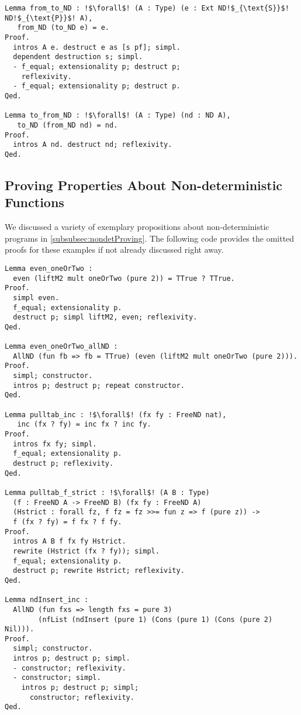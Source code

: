 \begin{verbatim}
Lemma from_to_ND : !$\forall$! (A : Type) (e : Ext ND!$_{\text{S}}$! ND!$_{\text{P}}$! A),
   from_ND (to_ND e) = e.
Proof.
  intros A e. destruct e as [s pf]; simpl.
  dependent destruction s; simpl.
  - f_equal; extensionality p; destruct p;
    reflexivity.
  - f_equal; extensionality p; destruct p.
Qed.

Lemma to_from_ND : !$\forall$! (A : Type) (nd : ND A),
   to_ND (from_ND nd) = nd.
Proof.
  intros A nd. destruct nd; reflexivity.
Qed.
\end{verbatim}

\subsection*{Proving Properties About Non\--deterministic Functions}
\label{subsec:appendix:proving}

We discussed a variety of exemplary propositions about non\--deterministic programs in \autoref{subsubsec:nondetProving}.
The following code provides the omitted proofs for these examples if not already discussed right away.

\begin{verbatim}
Lemma even_oneOrTwo :
  even (liftM2 mult oneOrTwo (pure 2)) = TTrue ? TTrue.
Proof.
  simpl even.
  f_equal; extensionality p.
  destruct p; simpl liftM2, even; reflexivity.
Qed.

Lemma even_oneOrTwo_allND :
  AllND (fun fb => fb = TTrue) (even (liftM2 mult oneOrTwo (pure 2))).
Proof.
  simpl; constructor.
  intros p; destruct p; repeat constructor.
Qed.

Lemma pulltab_inc : !$\forall$! (fx fy : FreeND nat),
   inc (fx ? fy) = inc fx ? inc fy.
Proof.
  intros fx fy; simpl.
  f_equal; extensionality p.
  destruct p; reflexivity.
Qed.
 
Lemma pulltab_f_strict : !$\forall$! (A B : Type)
  (f : FreeND A -> FreeND B) (fx fy : FreeND A)
  (Hstrict : forall fz, f fz = fz >>= fun z => f (pure z)) ->
  f (fx ? fy) = f fx ? f fy.
Proof.
  intros A B f fx fy Hstrict.
  rewrite (Hstrict (fx ? fy)); simpl.
  f_equal; extensionality p.
  destruct p; rewrite Hstrict; reflexivity.
Qed.

Lemma ndInsert_inc :
  AllND (fun fxs => length fxs = pure 3)
        (nfList (ndInsert (pure 1) (Cons (pure 1) (Cons (pure 2) Nil))).
Proof.
  simpl; constructor.
  intros p; destruct p; simpl.
  - constructor; reflexivity.
  - constructor; simpl.
    intros p; destruct p; simpl;
      constructor; reflexivity.
Qed.
\end{verbatim}

